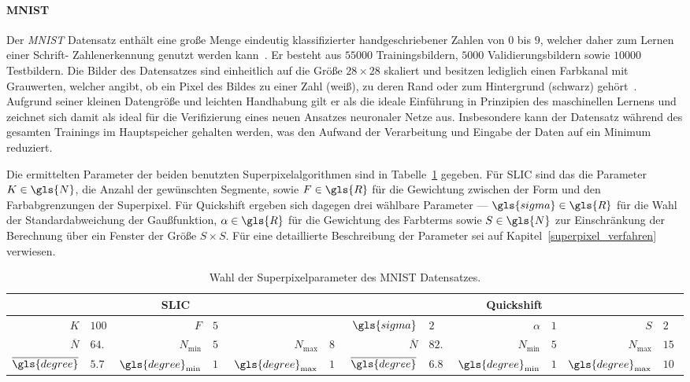 \paragraph{MNIST}
\label{mnist}

Der \emph{\gls{MNIST}} Datensatz enthält eine große Menge eindeutig klassifizierter handgeschriebener Zahlen von $0$ bis $9$, welcher daher zum Lernen einer Schrift- \bzw{} Zahlenerkennung genutzt werden kann~\cite{mnist}.
Er besteht aus $55000$ Trainingsbildern, $5000$ Validierungsbildern sowie $10000$ Testbildern.
Die Bilder des Datensatzes sind einheitlich auf die Größe $28 \times 28$ skaliert und besitzen lediglich einen Farbkanal mit Grauwerten, welcher angibt, ob ein Pixel des Bildes zu einer Zahl (weiß), zu deren Rand oder zum Hintergrund (schwarz) gehört~\cite{mnist}.
Aufgrund seiner kleinen Datengröße und leichten Handhabung gilt er als die ideale Einführung in Prinzipien des maschinellen Lernens und zeichnet sich damit als ideal für die Verifizierung eines neuen Ansatzes \bzgl{} neuronaler Netze aus.
Insbesondere kann der Datensatz während des gesamten Trainings im Hauptspeicher gehalten werden, was den Aufwand \bzgl{} der Verarbeitung und Eingabe der Daten auf ein Minimum reduziert.

Die ermittelten Parameter \bzgl{} der beiden benutzten Superpixelalgorithmen sind in Tabelle~\ref{tab:mnist} gegeben.
Für \gls{SLIC} sind das die Parameter $K \in \gls{N}$, \dhe{} die Anzahl der gewünschten Segmente, sowie $F \in \gls{R}$ für die Gewichtung zwischen der Form und den Farbabgrenzungen der Superpixel.
Für Quickshift ergeben sich dagegen drei wählbare Parameter — $\gls{sigma} \in \gls{R}$ für die Wahl der Standardabweichung der Gaußfunktion, $\alpha \in \gls{R}$ für die Gewichtung des Farbterms sowie $S \in \gls{N}$ zur Einschränkung der Berechnung über ein Fenster der Größe $S \times S$.
Für eine detaillierte Beschreibung der Parameter sei auf Kapitel~\ref{superpixel_verfahren} verwiesen.
\begin{table}[t]
\centering
\begin{tabular}{rlrlrlrlrlrl}
  \toprule
  \multicolumn{6}{c}{\gls{SLIC}} & \multicolumn{6}{c}{Quickshift}\\
  \midrule
  $K$ & $100$ & $F$ & $5$ & & & $\gls{sigma}$ & $2$ & $\alpha$ & $1$ & $S$ & $2$\\
  \midrule
  $\overline{N}$ & $64.6$ & $N_{\min}$ & $50$ & $N_{\max}$ & $80$ & $\overline{N}$ & $82.1$ & $N_{\min}$ & $5$ & $N_{\max}$ & $154$\\
  $\overline{\gls{degree}}$ & $5.7$ & $\gls{degree}_{\min}$ & $1$ & $\gls{degree}_{\max}$ & $19$ & $\overline{\gls{degree}}$ & $6.8$ & $\gls{degree}_{\min}$ & $1$ & $\gls{degree}_{\max}$ & $101$\\
  \bottomrule
\end{tabular}
\caption[\gls{MNIST} Superpixelparameter]{Wahl der Superpixelparameter des \gls{MNIST} Datensatzes.}
\label{tab:mnist}
\end{table}


